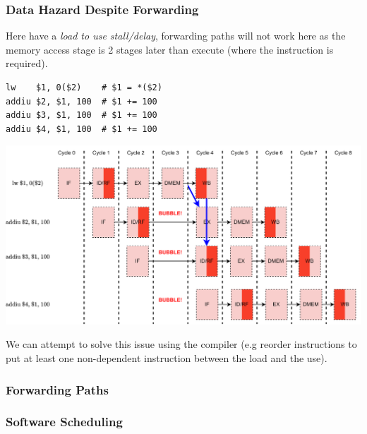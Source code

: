 \subsubsection{Data Hazard Despite Forwarding}
Here have a \textit{load to use stall/delay}, forwarding paths will not work here as the memory access stage is 2 stages later than execute (where the instruction is required).
\begin{verbatim}
lw    $1, 0($2)    # $1 = *($2)
addiu $2, $1, 100  # $1 += 100 
addiu $3, $1, 100  # $1 += 100
addiu $4, $1, 100  # $1 += 100
\end{verbatim}
\begin{center}
    \includegraphics[width=.9\textwidth]{pipelining/images/pipeline_operand_forward_3.drawio.png}
\end{center}
We can attempt to solve this issue using the compiler (e.g reorder instructions to put at least one non-dependent instruction between the load and the use).
\subsubsection{Forwarding Paths}
\subsubsection{Software Scheduling}


